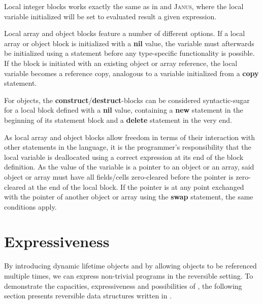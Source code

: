 Local integer blocks works exactly the same as in  and \textsc{Janus}, where the local variable initialized will be set to evaluated result a given expression.

Local array and object blocks feature a number of different options. If a local array or object block is initialized with a \textbf{nil} value, the variable must afterwards be initialized using a  statement before any type-specific functionality is possible. If the block is initiated with an existing object or array reference, the local variable becomes a reference copy, analogous to a variable initialized from a \textbf{copy} statement. 

For objects, the \textbf{construct}/\textbf{destruct}-blocks can be considered syntactic-sugar for a local block defined with a \textbf{nil} value, containing a \textbf{new} statement in the beginning of its statement block and a \textbf{delete} statement in the very end.

As local array and object blocks allow freedom in terms of their interaction with other statements in the language, it is the programmer's responsibility that the local variable is deallocated using a correct expression at its end of the block definition. As the value of the variable is a pointer to an object or an array, said object or array must have all fields/cells zero-cleared before the pointer is zero-cleared at the end of the local block. If the pointer is at any point exchanged with the pointer of another object or array using the \textbf{swap} statement, the same conditions apply.  


\section{\rooplpp Expressiveness}
\label{sec:rooplpp-expressiveness}
By introducing dynamic lifetime objects and by allowing objects to be referenced multiple times, we can express non-trivial programs in the reversible setting. To demonstrate the capacities, expressiveness and possibilities of \rooplpp, the following section presents reversible data structures written in \rooplpp.

